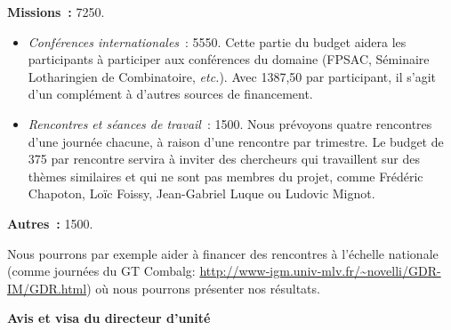 \documentclass[10pt,reqno]{amsart}
\numberwithin{equation}{subsection}
\begin{document}
{\bf Missions~:} 7250\texteuro.
\begin{itemize}[fullwidth]
    \item {\em Conférences internationales}~: 5550\texteuro.
    Cette partie du budget aidera les participants à participer aux
    conférences du domaine (FPSAC, Séminaire Lotharingien de
    Combinatoire, {\em etc.}). Avec 1387,50\texteuro{} par participant,
    il s'agit d'un complément à d'autres sources de financement.

    \item {\em Rencontres et séances de travail}~: 1500\texteuro.
    Nous prévoyons quatre
    rencontres d'une journée chacune, à raison d'une rencontre par
    trimestre. 
    Le budget
    de 375\texteuro{} par rencontre servira à inviter des chercheurs
    qui travaillent sur des thèmes similaires et qui ne sont pas
    membres du projet, comme Frédéric Chapoton, Loïc Foissy, Jean-Gabriel
    Luque ou Ludovic Mignot.
\end{itemize}

{\bf Autres~:} 1500\texteuro.

Nous pourrons par exemple aider à financer des rencontres 
à l'échelle nationale (comme journées du GT Combalg:
\url{http://www-igm.univ-mlv.fr/~novelli/GDR-IM/GDR.html}) où 
nous pourrons présenter nos résultats.




\bigskip

\Large{\bf{Avis et visa du directeur d’unité}}
\bigskip
\end{document}

